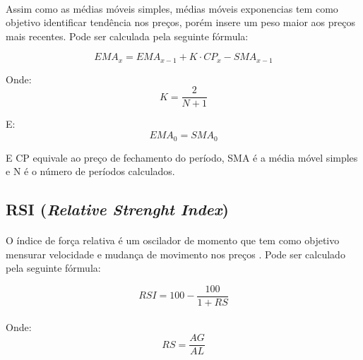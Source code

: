 \documentclass[grad,numbers]{coppe}
\begin{document}
            \paragraph{}Assim como as médias móveis simples, médias móveis exponencias tem como objetivo identificar tendência nos preços, porém insere um peso maior aos preços mais recentes. Pode ser calculada pela seguinte fórmula:
            
            \begin{equation}
                EMA_x = EMA_{x-1} + K \cdot CP_x - SMA_{x-1}
            \end{equation}
            
            Onde:
            \begin{equation}
                K = \frac{2}{N + 1}
            \end{equation}
            
            E: 
            \begin{equation}
                EMA_{0} = SMA_{0}
            \end{equation}
            
            E CP equivale ao preço de fechamento do período, SMA é a média móvel simples e N é o número de períodos calculados. 
            
        \subsection{RSI (\textit{Relative Strenght Index})} \label{sub:rsi}
            \paragraph{}O índice de força relativa é um oscilador de momento que tem como objetivo mensurar velocidade e mudança de movimento nos preços \cite{rsi-indicator}. Pode ser calculado pela seguinte fórmula:
            
            \begin{equation}
                RSI = 100 - \frac{100}{1 + RS}
            \end{equation}
            \paragraph{}Onde:
            \begin{equation}
                RS = \frac{AG}{AL}
            \end{equation}
            
\end{document}
